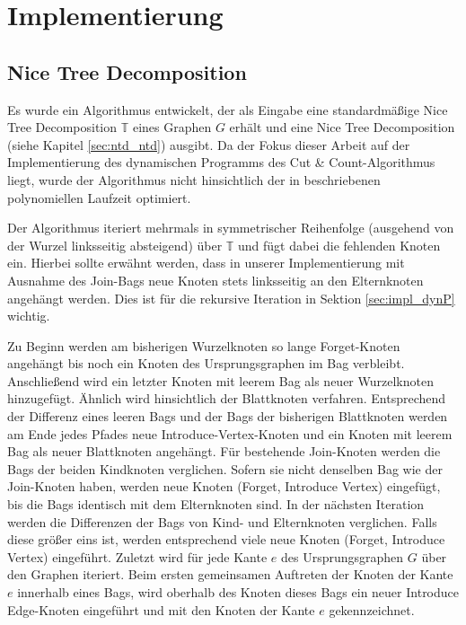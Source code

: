 \chapter{Implementierung}
\label{c:impl}

\section{Nice Tree Decomposition}
\label{sec:impl_ntd}
Es wurde ein Algorithmus entwickelt, der als Eingabe eine standardmäßige Nice Tree Decomposition $\mathbb{T}$ eines Graphen $G$ erhält und eine Nice Tree Decomposition (siehe Kapitel \ref{sec:ntd_ntd}) ausgibt. 
Da der Fokus dieser Arbeit auf der Implementierung des dynamischen Programms des Cut \& Count-Algorithmus liegt, wurde der Algorithmus nicht hinsichtlich der in \cite{kloks1994} beschriebenen polynomiellen Laufzeit optimiert. 

Der Algorithmus iteriert mehrmals in symmetrischer Reihenfolge (ausgehend von der Wurzel linksseitig absteigend) über $\mathbb{T}$ und fügt dabei die fehlenden Knoten ein. 
Hierbei sollte erwähnt werden, dass in unserer Implementierung mit Ausnahme des \glqq Join\grqq -Bags neue Knoten stets linksseitig an den Elternknoten angehängt werden. 
Dies ist für die rekursive Iteration in Sektion \ref{sec:impl_dynP} wichtig.

Zu Beginn werden am bisherigen Wurzelknoten so lange \glqq Forget\grqq -Knoten angehängt bis noch ein Knoten des Ursprungsgraphen im Bag verbleibt. 
Anschließend wird ein letzter Knoten mit leerem Bag als neuer Wurzelknoten hinzugefügt. 
Ähnlich wird hinsichtlich der Blattknoten verfahren. 
Entsprechend der Differenz eines leeren Bags und der Bags der bisherigen Blattknoten werden am Ende jedes Pfades neue \glqq Introduce-Vertex\grqq -Knoten und ein Knoten mit leerem Bag als neuer Blattknoten angehängt. 
Für bestehende \glqq Join\grqq -Knoten werden die Bags der beiden Kindknoten verglichen. 
Sofern sie nicht denselben Bag wie der \glqq Join\grqq -Knoten haben, werden neue Knoten (\glqq Forget\grqq , \glqq Introduce Vertex\grqq ) eingefügt, bis die Bags identisch mit dem Elternknoten sind. 
In der nächsten Iteration werden die Differenzen der Bags von Kind- und Elternknoten verglichen. 
Falls diese größer eins ist, werden entsprechend viele neue Knoten (\glqq Forget\grqq , \glqq Introduce Vertex\grqq ) eingeführt.
Zuletzt wird für jede Kante $e$ des Ursprungsgraphen $G$ über den Graphen iteriert. 
Beim ersten gemeinsamen Auftreten der Knoten der Kante $e$ innerhalb eines Bags, wird oberhalb des Knoten dieses Bags ein neuer \glqq Introduce Edge\grqq -Knoten eingeführt und mit den Knoten der Kante $e$ gekennzeichnet.


